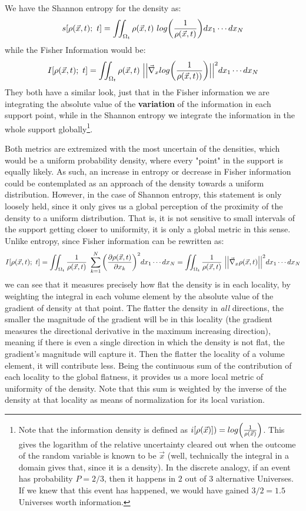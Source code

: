 \documentclass[11pt, a4paper]{article} %
\begin{document}
We have the Shannon entropy for the density as:
\begin{equation}
s[\rho(\vec{x},t);\ t]=\iint_{\Omega_t} \rho(\vec{x},t)\ log\qty(\frac{1}{\rho(\vec{x},t)}) dx_1\cdots dx_N
\end{equation}
while the Fisher Information would be:
\begin{equation}
I[\rho(\vec{x},t);\ t]=\iint_{\Omega_t} \rho(\vec{x},t)\ \Big|\Big|\vec{\nabla}_{x}log\qty(\frac{1}{\rho(\vec{x},t))})\Big|\Big|^2 dx_1\cdots dx_N
\end{equation}
They both have a similar look, just that in the Fisher information we are integrating the absolute value of the {\bf variation} of the information in each support point, while in the Shannon entropy we integrate the information in the whole support globally\footnote{Note that the information density is defined as $i[\rho(\vec{x})])=log\qty(\frac{1}{\rho(\vec{x})})$. This gives the logarithm of the relative uncertainty cleared out when the outcome of the random variable is known to be $\vec{x}$ (well, technically the integral in a domain gives that, since it is a density). In the discrete analogy, if an event has probability $P=2/3$, then it happens in $2$ out of $3$ alternative Universes. If we knew that this event has happened, we would have gained $3/2=1.5$ Universes worth information.}.

Both metrics are extremized with the most uncertain of the densities, which would be a uniform probability density, where every "point" in the support is equally likely. As such, an increase in entropy or decrease in Fisher information could be contemplated as an approach of the density towards a uniform distribution. However, in the case of Shannon entropy, this statement is only loosely held, since it only gives us a global perception of the proximity of the density to a uniform distribution. That is, it is not sensitive to small intervals of the support getting closer to uniformity, it is only a global metric in this sense. Unlike entropy, since Fisher information can be rewritten as:
\begin{equation}
I[\rho(\vec{x},t);\ t]=\iint_{\Omega_t} \frac{1}{\rho(\vec{x},t)}\ \sum_{k=1}^N \qty(\pdv{\rho(\vec{x},t)}{x_k})^2 dx_1\cdots dx_N=\iint_{\Omega_t} \frac{1}{\rho(\vec{x},t)}\ \Big|\Big|\vec{\nabla}_{x}\rho(\vec{x},t)\Big|\Big|^2 dx_1\cdots dx_N
\end{equation}
we can see that it measures precisely how flat the density is in each locality, by weighting the integral in each volume element by the absolute value of the gradient of density at that point. The flatter the density in {\em all} directions, the smaller the magnitude of the gradient will be in this locality (the gradient measures the directional derivative in the maximum increasing direction), meaning if there is even a single direction in which the density is not flat, the gradient's magnitude will capture it. Then the flatter the locality of a volume element, it will contribute less. Being the continuous sum of the contribution of each locality to the global flatness, it provides us a more local metric of uniformity of the density. Note that this sum is weighted by the inverse of the density at that locality as means of normalization for its local variation.
\end{document}
